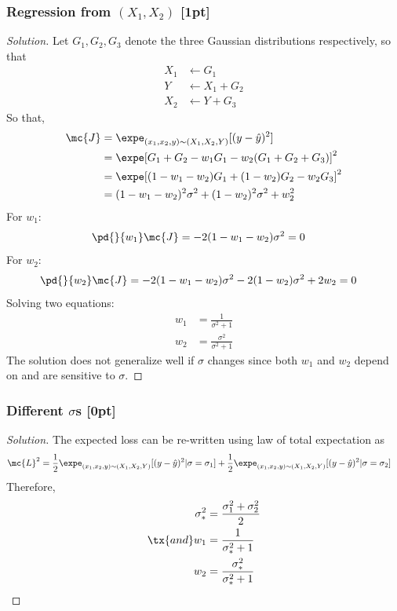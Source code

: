 \documentclass{article}
\begin{document}
	\subsubsection{Regression from $(X_1, X_2)$ [1pt]}
	\begin{proof}[Solution]
		Let $G_1, G_2, G_3$ denote the three Gaussian distributions respectively, so that
		\begin{align}
			X_1 &\leftarrow G_1 \\
			Y &\leftarrow X_1 + G_2 \\
			X_2 &\leftarrow Y + G_3
		\end{align}
		So that,
		\begin{align}
			\mc{J} &= \expe_{(x_1, x_2, y) \sim (X_1, X_2, Y)} [(y - \hat{y})^2] \\
			&= \expe [G_1 + G_2 - w_1 G_1 - w_2 (G_1 + G_2 + G_3)]^2 \\
			&= \expe [(1 - w_1 - w_2)G_1 + (1 - w_2)G_2 - w_2 G_3 ]^2 \\
			&= (1-w_1-w_2)^2 \sigma^2 + (1 - w_2)^2 \sigma^2 + w_2^2
		\end{align}
		For $w_1$:
		\begin{align}
			&\pd{}{w_1} \mc{J} = - 2 (1 - w_1 - w_2) \sigma^2 = 0
		\end{align}
		For $w_2$:
		\begin{align}
			&\pd{}{w_2} \mc{J}
			= - 2 (1 - w_1 - w_2) \sigma^2 
			- 2 (1 - w_2) \sigma^2
			+ 2 w_2 = 0 
		\end{align}
		Solving two equations:
		\begin{align}
			w_1 &= \frac{1}{\sigma ^2+1} \\
			w_2 &= \frac{\sigma ^2}{\sigma ^2+1}
		\end{align}
		The solution does not generalize well if $\sigma$ changes since both $w_1$ and $w_2$ depend on and are sensitive to $\sigma$.
	\end{proof}
	
	\subsubsection{Different $\sigma$s [0pt]}
	\begin{proof}[Solution]
		The expected loss can be re-written using law of total expectation as
		\begin{align}
			\mc{L}^2 &= \frac{1}{2} \expe_{(x_1, x_2, y) \sim (X_1, X_2, Y)} [(y - \hat{y})^2|\sigma=\sigma_1]
			+ \frac{1}{2} \expe_{(x_1, x_2, y) \sim (X_1, X_2, Y)} [(y - \hat{y})^2|\sigma=\sigma_2]
		\end{align}
		Therefore,	
		\begin{align}
			\sigma_*^2 &= \frac{\sigma_1^2 + \sigma_2^2}{2} \\
			\tx{and }
			w_1 &= \frac{1}{\sigma_*^2+1} \\
			w_2 &= \frac{\sigma_*^2}{\sigma_*^2+1}
		\end{align}
	\end{proof}
	
\end{document}
